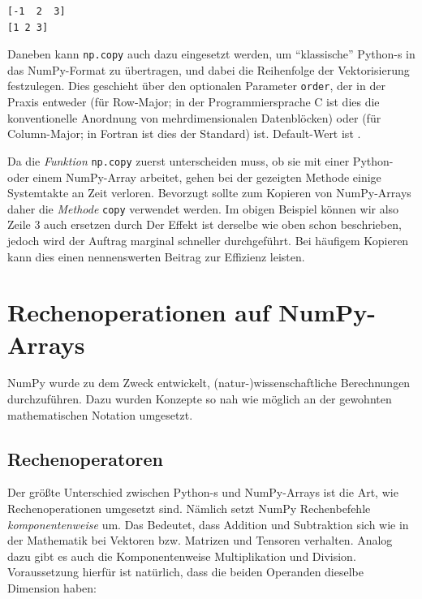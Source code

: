 \begin{cmdbox}
\begin{verbatim}
[-1  2  3]
[1 2 3]
\end{verbatim}
\end{cmdbox}

Daneben kann \texttt{np.copy} auch dazu eingesetzt werden, um \enquote{klassische} Python-s in das NumPy-Format zu übertragen, und dabei die Reihenfolge der Vektorisierung festzulegen. Dies geschieht über den optionalen Parameter \texttt{order}, der in der Praxis entweder  (für Row-Major; in der Programmiersprache C ist dies die konventionelle Anordnung von mehrdimensionalen Datenblöcken) oder  (für Column-Major; in Fortran ist dies der Standard) ist. Default-Wert ist .

Da die \emph{Funktion} \texttt{np.copy} zuerst unterscheiden muss, ob sie mit einer Python- oder einem NumPy-Array arbeitet, gehen bei der gezeigten Methode einige Systemtakte an Zeit verloren. Bevorzugt sollte zum Kopieren von NumPy-Arrays daher die \emph{Methode} \texttt{copy} verwendet werden. Im obigen Beispiel können wir also Zeile 3 auch ersetzen durch
Der Effekt ist derselbe wie oben schon beschrieben, jedoch wird der Auftrag marginal schneller durchgeführt. Bei häufigem Kopieren kann dies einen nennenswerten Beitrag zur Effizienz leisten.

\section{Rechenoperationen auf NumPy-Arrays}
NumPy wurde zu dem Zweck entwickelt, (natur-)wissenschaftliche Berechnungen durchzuführen. Dazu wurden Konzepte so nah wie möglich an der gewohnten mathematischen Notation umgesetzt.

\subsection{Rechenoperatoren}
Der größte Unterschied zwischen Python-s und NumPy-Arrays ist die Art, wie Rechenoperationen umgesetzt sind. Nämlich setzt NumPy Rechenbefehle \emph{komponentenweise} um. Das Bedeutet, dass Addition und Subtraktion sich wie in der Mathematik bei Vektoren bzw. Matrizen und Tensoren verhalten. Analog dazu gibt es auch die Komponentenweise Multiplikation und Division. Voraussetzung hierfür ist natürlich, dass die beiden Operanden dieselbe Dimension haben:

